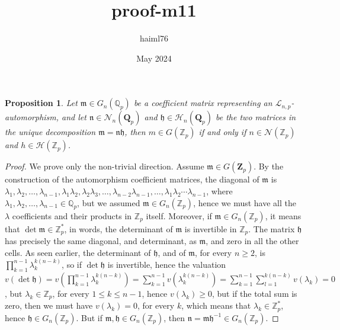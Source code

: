 \documentclass[12pt]{article}
\title{proof-m11}
\author{haiml76 }
\date{May 2024}
\newtheorem{proposition}[theorem]{Proposition}
\begin{document}
\section{}
\subsection{}
\begin{proposition}
\label{prop.centralizer.dimension}
Let $\mathfrak{m}\in G_n(\mathbb{Q}_p)$ be a coefficient matrix representing an $\mathcal{L}_{n,p}$-automorphism, and let $\mathfrak{n}\in\mathcal{N}_n(\mathbf{Q}_p)$ and $\mathfrak{h}\in\mathcal{H}_n(\mathbf{Q}_p)$ be the two matrices in the unique decomposition $\mathfrak{m}=\mathfrak{n}\mathfrak{h}$, then $m\in G(\mathbb{Z}_p)$ if and only if $n\in\mathcal{N}(\mathbb{Z}_p)$ and $h\in\mathcal{H}(\mathbb{Z}_p)$.
\end{proposition}
\begin{proof}
We prove only the non-trivial direction. Assume $\mathfrak{m}\in G(\mathbf{Z}_p)$. By the construction of the automorphism coefficient matrices, the diagonal of $\mathfrak{m}$ is $\lambda_1,\lambda_2,\dots,\lambda_{n-1},\lambda_1\lambda_2,\lambda_2\lambda_3,\dots,\lambda_{n-2}\lambda_{n-1},\dots,\lambda_1\lambda_2\cdots\lambda_{n-1}$, where $\lambda_1,\lambda_2,\dots,\lambda_{n-1}\in\mathbb{Q}_p$, but we assumed $\mathfrak{m}\in G_n(\mathbb{Z}_p)$, hence we must have all the $\lambda$ coefficients and their products in $\mathbb{Z}_p$ itself. Moreover, if $\mathfrak{m}\in G_n(\mathbb{Z}_p)$, it means that $\det\mathfrak{m}\in\mathbb{Z}_p^\ast$, in words, the determinant of $\mathfrak{m}$ is invertible in $\mathbb{Z}_p$. The matrix $\mathfrak{h}$ has precisely the same diagonal, and determinant, as $\mathfrak{m}$, and zero in all the other cells. As seen earlier, the determinant of $\mathfrak{h}$, and of $\mathfrak{m}$, for every $n\geq 2$, is $\prod_{k=1}^{n-1}\lambda_k^{k(n-k)}$, so if $\det\mathfrak{h}$ is invertible, hence the valuation $v(\det\mathfrak{h})=v(\prod_{k=1}^{n-1}\lambda_k^{k(n-k)})=\sum_{k=1}^{n-1}v(\lambda_k^{k(n-k)})=\sum_{k=1}^{n-1}\sum_{l=1}^{k(n-k)}v(\lambda_k)=0$, but $\lambda_k\in\mathbb{Z}_p$, for every $1\leq k\leq n-1$, hence $v(\lambda_k)\geq 0$, but if the total sum is zero, then we must have $v(\lambda_k)=0$, for every $k$, which means that $\lambda_k\in\mathbb{Z}_p^\ast$, hence $\mathfrak{h}\in G_n(\mathbb{Z}_p)$. But if $\mathfrak{m},\mathfrak{h}\in G_n(\mathbb{Z}_p)$, then $\mathfrak{n}=\mathfrak{m}\mathfrak{h^{-1}}\in G_n(\mathbb{Z}_p)$.
\end{proof}
\end{document}
